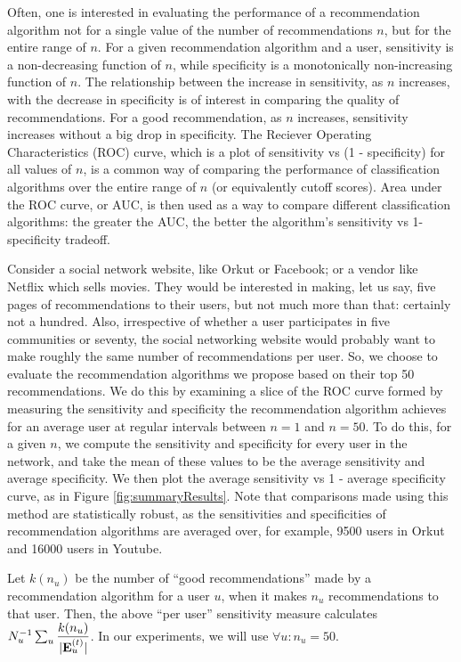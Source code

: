 Often, one is interested in evaluating the performance of a recommendation algorithm not for a single value of the number of recommendations $n$, but for the entire range of $n$. For a given recommendation algorithm and a user, sensitivity is a non-decreasing function of $n$, while specificity is a monotonically non-increasing function of $n$. The relationship between the increase in sensitivity, as $n$ increases, with the decrease in specificity is of interest in comparing the quality of recommendations. For a good recommendation, as $n$ increases, sensitivity increases without a big drop in specificity. The Reciever Operating Characteristics (ROC) curve, which is a plot of sensitivity vs (1 - specificity) for all values of $n$, is a common way of comparing the performance of classification algorithms over the entire range of $n$ (or equivalently cutoff scores). Area under the ROC curve, or AUC, is then used as a way to compare different classification algorithms: the greater the AUC, the better the algorithm's sensitivity vs 1-specificity tradeoff.

Consider a social network website, like Orkut or Facebook; or a vendor like Netflix which sells movies. They would be interested in making, let us say, five pages of recommendations to their users, but not much more than that: certainly not a hundred. Also, irrespective of whether a user participates in five communities or seventy, the social networking website would probably want to make roughly the same number of recommendations per user. So, we choose to evaluate the recommendation algorithms we propose based on their top 50 recommendations. We do this by examining a slice of the ROC curve formed by measuring the sensitivity and specificity the recommendation algorithm achieves for an average user at regular intervals between $n = 1$ and $n = 50$. To do this, for a given $n$, we compute the sensitivity and specificity for every user in the network, and take the mean of these values to be the average sensitivity and average specificity. We then plot the average sensitivity vs 1 - average specificity curve, as in Figure \ref{fig:summaryResults}. Note that comparisons made using this method are statistically robust, as the sensitivities and specificities of recommendation algorithms are averaged over, for example, 9500 users in Orkut and 16000 users in Youtube.

Let $k(n_u)$ be the number of ``good recommendations'' made by a recommendation algorithm for a user $u$, when it makes $n_u$ recommendations to that user. Then, the above ``per user'' sensitivity measure calculates $N_u^{-1} \sum_u \displaystyle\frac{k(n_u) }{|\mathbf{E}_u^{(t)}|}$. In our experiments, we will use $\forall u: n_u = 50$.

